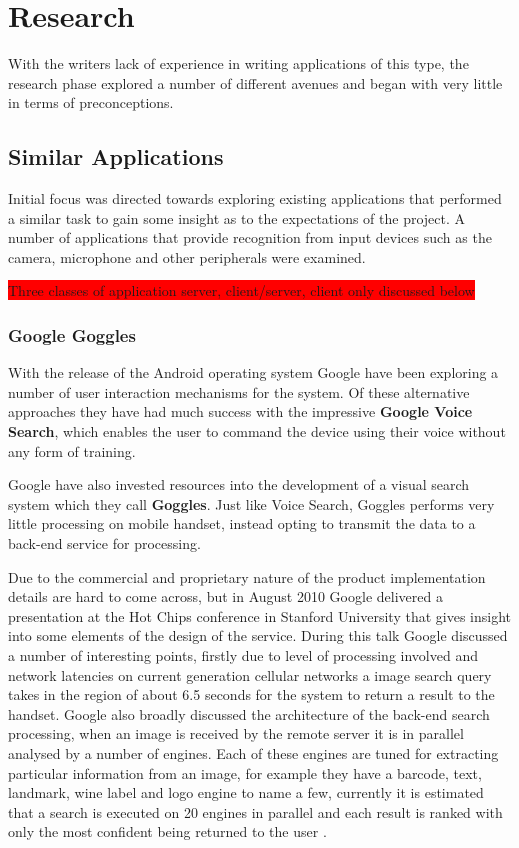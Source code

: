 \chapter{Research}
With the writers lack of experience in writing applications of this type, the research phase explored a number of different avenues and began with very little in terms of preconceptions. 

\section{Similar Applications}
Initial focus was directed towards exploring existing applications that performed a similar task to gain some insight as to the expectations of the project. A number of applications that provide recognition from input devices such as the camera, microphone and other peripherals were examined.

\colorbox{red}{Three classes of application server, client/server, client only discussed below}

\subsection{Google Goggles}
With the release of the Android operating system Google have been exploring a number of user interaction mechanisms for the system. Of these alternative approaches they have had much success with the impressive \textbf{Google Voice Search}, which enables the user to command the device using their voice without any form of training.

Google have also invested resources into the development of a visual search system which they call \textbf{Goggles}. Just like Voice Search, Goggles performs very little processing on mobile handset, instead opting to transmit the data to a back-end service for processing.

Due to the commercial and proprietary nature of the product implementation details are hard to come across, but in August 2010 Google delivered a presentation at the Hot Chips conference in Stanford University that gives insight into some elements of the design of the service. During this talk Google discussed a number of interesting points, firstly due to level of processing involved and network latencies on current generation cellular networks a image search query takes in the region of about 6.5 seconds for the system to return a result to the handset. Google also broadly discussed the architecture of the back-end search processing, when an image is received by the remote server it is in parallel analysed by a number of engines. Each of these engines are tuned for extracting particular information from an image, for example they have a barcode, text, landmark, wine label and logo engine to name a few, currently it is estimated that a search is executed on 20 engines in parallel and each result is ranked with only the most confident being returned to the user \cite{vbgoggles10, sbs10}.

